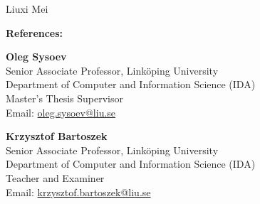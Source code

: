 \documentclass[11pt,a4paper]{article}
\begin{document}
Liuxi Mei

\vspace{0.5cm}
\noindent
\begin{minipage}{\textwidth}
\textbf{References:}

\vspace{0.3cm}
\begin{minipage}[t]{0.48\textwidth}
\textbf{Oleg Sysoev}\\
Senior Associate Professor, Linköping University\\
Department of Computer and Information Science (IDA)\\
Master's Thesis Supervisor\\
Email: \href{mailto:oleg.sysoev@liu.se}{oleg.sysoev@liu.se}
\end{minipage}%
\hfill
\begin{minipage}[t]{0.48\textwidth}
\textbf{Krzysztof Bartoszek}\\
Senior Associate Professor, Linköping University\\
Department of Computer and Information Science (IDA)\\
Teacher and Examiner\\
Email: \href{mailto:krzysztof.bartoszek@liu.se}{krzysztof.bartoszek@liu.se}
\end{minipage}
\end{minipage}
\end{document}
